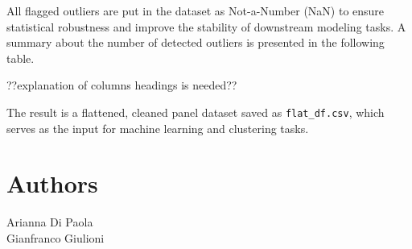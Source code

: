\documentclass[11pt,a4paper]{article}
\begin{document}
All flagged outliers are put in the dataset as Not-a-Number (NaN) to ensure statistical robustness and improve the stability of downstream modeling tasks.
A summary about the number of detected outliers is presented in the following table.



??explanation of columns headings is needed??


The result is a flattened, cleaned panel dataset saved as \texttt{flat\_df.csv}, which serves as the input for machine learning and clustering tasks.

\section*{Authors}
Arianna Di Paola \\ Gianfranco Giulioni
\end{document}
